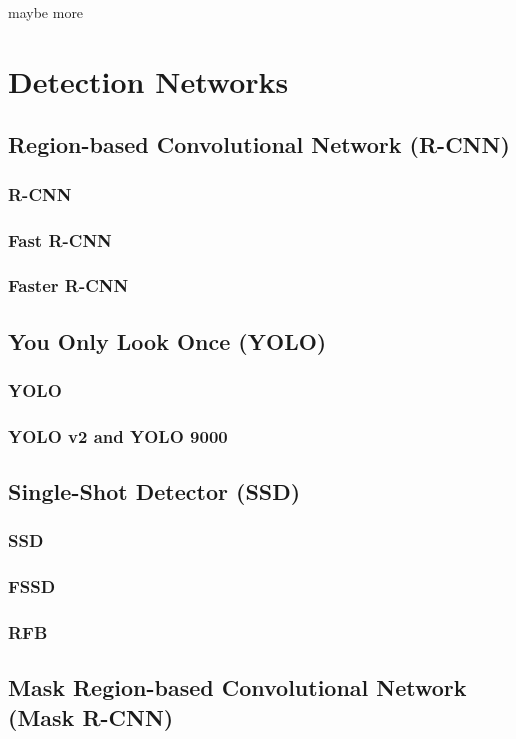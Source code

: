 maybe more

\section{Detection Networks}

\subsection{Region-based Convolutional Network (R-CNN)}
\subsubsection{R-CNN}
\subsubsection{Fast R-CNN}
\subsubsection{Faster R-CNN}

\subsection{You Only Look Once (YOLO)}
\subsubsection{YOLO}
\label{sec:yolo}
\subsubsection{YOLO v2 and YOLO 9000}

\subsection{Single-Shot Detector (SSD)}
\label{sec:ssd}
\subsubsection{SSD}

\subsubsection{FSSD}
\subsubsection{RFB}

\subsection{Mask Region-based Convolutional Network (Mask R-CNN)}

